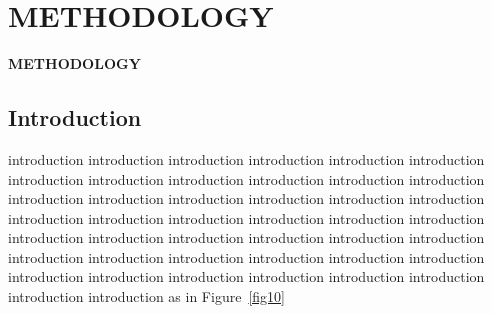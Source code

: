 \chapter{METHODOLOGY}
\pagebreak

\begin{center}
{\LARGE\textbf{METHODOLOGY}}
\end{center}

\section{Introduction}
 introduction introduction introduction introduction introduction introduction introduction introduction introduction introduction introduction introduction introduction introduction introduction introduction introduction introduction introduction introduction introduction introduction introduction introduction introduction introduction introduction introduction introduction introduction introduction introduction introduction introduction introduction introduction introduction introduction introduction introduction introduction introduction introduction introduction as in Figure~\ref{fig10}
